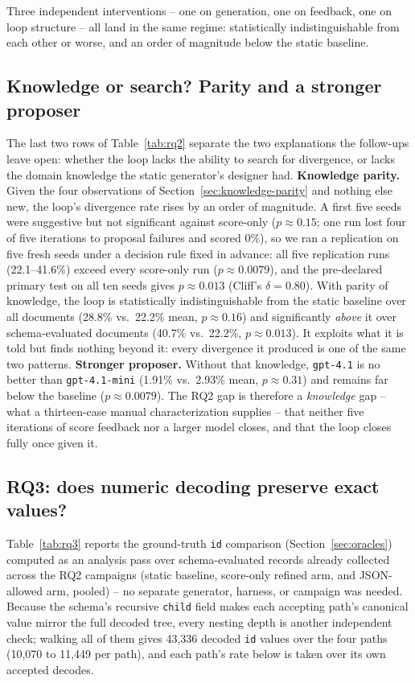 Three independent interventions -- one on generation, one on feedback, one
on loop structure -- all land in the same regime: statistically
indistinguishable from each other or worse, and an order of magnitude below
the static baseline.

\subsection{Knowledge or search? Parity and a stronger proposer}
\label{sec:evaluation-parity}
The last two rows of Table~\ref{tab:rq2} separate the two explanations the
follow-ups leave open: whether the loop lacks the ability to search for
divergence, or lacks the domain knowledge the static generator's designer
had. \textbf{Knowledge parity.} Given the four observations of
Section~\ref{sec:knowledge-parity} and nothing else new, the loop's
divergence rate rises by an order of magnitude. A first five seeds were
suggestive but not significant against score-only ($p \approx 0.15$; one
run lost four of five iterations to proposal failures and scored 0\%), so
we ran a replication on five fresh seeds under a decision rule fixed in
advance: all five replication runs (22.1--41.6\%) exceed every score-only
run ($p \approx 0.0079$), and the pre-declared primary test on all ten
seeds gives $p \approx 0.013$ (Cliff's $\delta = 0.80$). With parity of
knowledge, the loop is statistically indistinguishable from the static
baseline over all documents (28.8\% vs.\ 22.2\% mean, $p \approx 0.16$)
and significantly \emph{above} it over schema-evaluated documents (40.7\%
vs.\ 22.2\%, $p \approx 0.013$). It exploits what it is told but finds
nothing beyond it: every divergence it produced is one of the same two
patterns. \textbf{Stronger proposer.} Without that knowledge,
\texttt{gpt-4.1} is no better than \texttt{gpt-4.1-mini} (1.91\% vs.\
2.93\% mean, $p \approx 0.31$) and remains far below the baseline
($p \approx 0.0079$). The RQ2 gap is therefore a \emph{knowledge} gap --
what a thirteen-case manual characterization supplies -- that neither five
iterations of score feedback nor a larger model closes, and that the loop
closes fully once given it.

\subsection{RQ3: does numeric decoding preserve exact values?}
\label{sec:evaluation-rq3}
Table~\ref{tab:rq3} reports the ground-truth \texttt{id} comparison
(Section~\ref{sec:oracles}) computed as an analysis pass over
schema-evaluated records already collected across the RQ2 campaigns (static
baseline, score-only refined arm, and JSON-allowed arm, pooled) -- no
separate generator, harness, or campaign was needed. Because the schema's
recursive \texttt{child} field makes each accepting path's canonical value
mirror the full decoded tree, every nesting depth is another independent
check; walking all of them gives 43{,}336 decoded \texttt{id} values over
the four paths (10{,}070 to 11{,}449 per path), and each path's rate below is
taken over its own accepted decodes.

